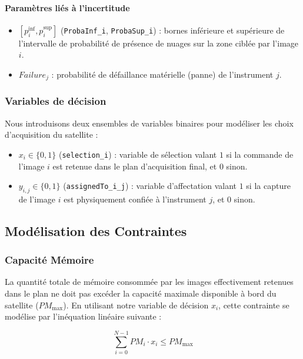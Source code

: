\documentclass[8pt]{article}
\begin{document}
\paragraph{Paramètres liés à l'incertitude}
\begin{itemize}
    \item \textbf{$[p_i^{\inf}, p_i^{\sup}]$} (\texttt{ProbaInf\_i}, \texttt{ProbaSup\_i}) : bornes inférieure et supérieure de l'intervalle de probabilité de présence de nuages sur la zone ciblée par l'image $i$.  
    \item \textbf{$Failure_j$} : probabilité de défaillance matérielle (panne) de l'instrument $j$.
\end{itemize}

\subsubsection{Variables de décision}

Nous introduisons deux ensembles de variables binaires pour modéliser les choix d'acquisition du satellite :
\begin{itemize}
    \item \textbf{$x_i \in \{0, 1\}$} (\texttt{selection\_i}) : variable de sélection valant $1$ si la commande de l'image $i$ est retenue dans le plan d'acquisition final, et $0$ sinon.
    \item \textbf{$y_{i,j} \in \{0, 1\}$} (\texttt{assignedTo\_i\_j}) : variable d'affectation valant $1$ si la capture de l'image $i$ est physiquement confiée à l'instrument $j$, et $0$ sinon.
\end{itemize}


\subsection{Modélisation des Contraintes}

\subsubsection{Capacité Mémoire}

La quantité totale de mémoire consommée par les images effectivement retenues dans le plan ne doit pas excéder la capacité maximale disponible à bord du satellite ($PM_{\max}$). En utilisant notre variable de décision $x_i$, cette contrainte se modélise par l'inéquation linéaire suivante :

$$ \sum_{i=0}^{N-1} PM_i \cdot x_i \le PM_{\max} $$
\end{document}
